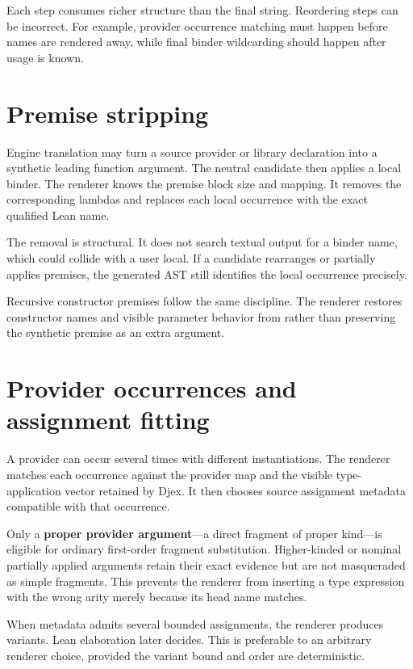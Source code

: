 \documentclass[10pt,letterpaper,oneside]{report}
\newcommand{\code}[1]{\texttt{\detokenize{#1}}}
\newcommand{\term}[1]{\textbf{#1}}
\begin{document}
Each step consumes richer structure than the final string. Reordering steps can be incorrect. For example, provider occurrence matching must happen before names are rendered away, while final binder wildcarding should happen after usage is known.

\section{Premise stripping}

Engine translation may turn a source provider or library declaration into a synthetic leading function argument. The neutral candidate then applies a local binder. The renderer knows the premise block size and mapping. It removes the corresponding lambdas and replaces each local occurrence with the exact qualified Lean name.

The removal is structural. It does not search textual output for a binder name, which could collide with a user local. If a candidate rearranges or partially applies premises, the generated AST still identifies the local occurrence precisely.

Recursive constructor premises follow the same discipline. The renderer restores constructor names and visible parameter behavior from \code{CtorInfo} rather than preserving the synthetic premise as an extra argument.

\section{Provider occurrences and assignment fitting}

A provider can occur several times with different instantiations. The renderer matches each occurrence against the provider map and the visible type-application vector retained by Djex. It then chooses source assignment metadata compatible with that occurrence.

Only a \term{proper provider argument}---a direct fragment of proper kind---is eligible for ordinary first-order fragment substitution. Higher-kinded or nominal partially applied arguments retain their exact evidence but are not masqueraded as simple fragments. This prevents the renderer from inserting a type expression with the wrong arity merely because its head name matches.

When metadata admits several bounded assignments, the renderer produces variants. Lean elaboration later decides. This is preferable to an arbitrary renderer choice, provided the variant bound and order are deterministic.
\end{document}
